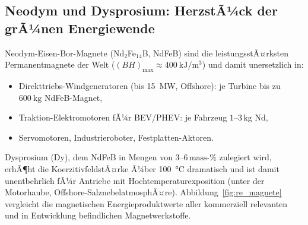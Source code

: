 ﻿\documentclass[12pt, a4paper]{report}
\theoremstyle{definition}
\theoremstyle{remark}
\begin{document}
\subsection{Neodym und Dysprosium: HerzstÃ¼ck der grÃ¼nen Energiewende}

Neodym-Eisen-Bor-Magnete (Nd$_2$Fe$_{14}$B, NdFeB) sind die leistungsstÃ¤rksten
Permanentmagnete der Welt ($(BH)_{\max} \approx \SI{400}{\kilo\joule\per\cubic\metre}$)
und damit unersetzlich in:
\begin{itemize}
  \item Direkttriebs-Windgeneratoren (bis \SI{15}{\mega\watt}, Offshore): je
        Turbine bis zu $\SI{600}{\kilogram}$ NdFeB-Magnet,
  \item Traktion-Elektromotoren fÃ¼r BEV/PHEV: je Fahrzeug $1$--$3\,\text{kg}$ Nd,
  \item Servomotoren, Industrieroboter, Festplatten-Aktoren.
\end{itemize}
Dysprosium (Dy), dem NdFeB in Mengen von $3$--$6\,\text{mass-\%}$ zulegiert
wird, erhÃ¶ht die KoerzitivfeldstÃ¤rke Ã¼ber \SI{100}{\celsius} dramatisch und
ist damit unentbehrlich fÃ¼r Antriebe mit Hochtemperaturexposition (unter der
Motorhaube, Offshore-SalznebelatmosphÃ¤re). Abbildung~\ref{fig:re_magnete}
vergleicht die magnetischen Energieproduktwerte aller kommerziell relevanten
und in Entwicklung befindlichen Magnetwerkstoffe.
\end{document}
